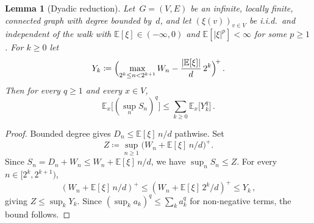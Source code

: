 \documentclass[aop]{imsart}
\theoremstyle{plain}
\newtheorem{lemma}[theorem]{Lemma}
\theoremstyle{definition}
\newcommand{\E}{\mathbb{E}}
\begin{document}
	\begin{lemma}[Dyadic reduction]\label{lem:dyadic}
		Let~$G = (V,E)$ be an infinite, locally finite, connected graph with degree bounded by~$d$, and let $(\xi(v))_{v\in V}$ be i.i.d.\ and independent of the walk with $\E[\xi]\in(-\infty,0)$ and $\E[|\xi|^p]<\infty$ for some $p\geq 1$. For $k\geq 0$ let
		\[
		Y_k\coloneqq\Bigl(\max_{2^k\leq n<2^{k+1}}W_n-\frac{|\E[\xi]|}{d}\,2^k\Bigr)^{\!+}\,.
		\]
		Then for every $q\geq 1$ and every $x\in V$,
		\begin{equation}\label{eq:dyadic-bound}
			\E_x\bigl[(\sup_n S_n)^q\bigr]\leq\sum_{k\geq 0}\E_x\bigl[Y_k^q\bigr]\,.
		\end{equation}
	\end{lemma}
	\begin{proof}
		Bounded degree gives $D_n\leq \E[\xi]\,n/d$ pathwise. Set
		\[
		Z\coloneqq\sup_{n\geq 1}\bigl(W_n+\E[\xi]\,n/d\bigr)^+.
		\]
		Since $S_n=D_n+W_n\leq W_n+\E[\xi]\,n/d$, we have $\sup_n S_n\leq Z$. For every $n\in[2^k,2^{k+1})$,
		\[
		(W_n+\E[\xi]\,n/d)^+\leq(W_n+\E[\xi]\,2^k/d)^+\leq Y_k\,,
		\]
		giving $Z\leq\sup_k Y_k$. Since $(\sup_k a_k)^q\leq\sum_k a_k^q$ for non-negative terms, the bound follows.
	\end{proof}
	
\end{document}
